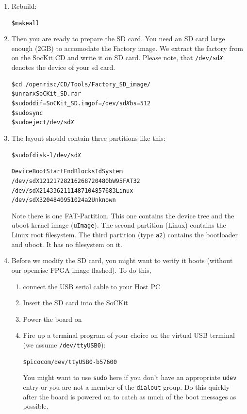 \documentclass[twoside]{article}
\begin{document}
\begin{enumerate}
\item Rebuild:
  \begin{alltt}
\$ make all    
  \end{alltt}

\item Then you are ready to prepare the SD card. You need an SD card
  large enough (2GB) to accomodate the Factory image. We extract the
  factory from on the SocKit CD and write it on SD card. Please note,
  that \texttt{/dev/sd\emph{X}} denotes the device of your sd card.

  \begin{alltt}
\$ cd ~/openrisc/CD/Tools/Factory_SD_image/
\$ unrar x SoCKit_SD.rar 
\$ sudo dd if=SoCKit_SD.img of=/dev/sd\emph{X} bs=512
\$ sudo sync
\$ sudo eject /dev/sd\emph{X}
  \end{alltt}

\item The layout should contain three partitions like this:
  \begin{alltt}
\$ sudo fdisk -l /dev/sd\emph{X}

   Device Boot      Start         End      Blocks   Id  System
/dev/sdX1         2121728     2162687       20480    b  W95 FAT32
/dev/sdX2           14336     2111487     1048576   83  Linux
/dev/sdX3            2048        4095        1024   a2  Unknown    
  \end{alltt}
Note there is one FAT-Partition. This one contains the device tree and
the uboot kernel image (\texttt{uImage}). The second partition
(Linux) contains the Linux root filesystem. The third partition (type
\texttt{a2}) contains the bootloader and uboot. It has no filesystem
on it.

\item Before we modify the SD card, you might want to verify it boots
  (without our openrisc FPGA image flashed). 
  To do this, 
  \begin{enumerate}
  \item connect the USB serial cable to your Host PC 
  \item Insert the SD card into the SoCKit
  \item Power the board on
  \item Fire up a terminal
    program of your choice on the virtual USB terminal (we assume
    \texttt{/dev/ttyUSB0}):
    \begin{alltt}
\$ picocom /dev/ttyUSB0 -b 57600
    \end{alltt}
    You might want to use \texttt{sudo} here if you don't have an
    appropriate \texttt{udev} entry or you are not a member of the
    \texttt{dialout} group.
    Do this quickly after the board is powered on to catch as much of
    the boot messages as possible.
  \end{enumerate}


\end{enumerate}
\end{document}
